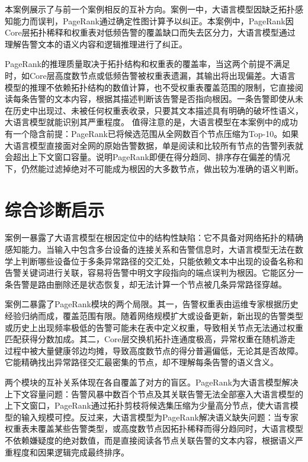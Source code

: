 本案例展示了与前一个案例相反的互补方向。案例一中，大语言模型因缺乏拓扑感知能力而误判，PageRank通过确定性图计算予以纠正。本案例中，PageRank因Core层拓扑稀释和权重表对低频告警的覆盖缺口而失去区分力，大语言模型通过理解告警文本的语义内容和逻辑推理进行了纠正。

PageRank的推理质量取决于拓扑结构和权重表的覆盖率，当这两个前提不满足时，如Core层高度数节点或低频告警被权重表遗漏，其输出将出现偏差。大语言模型的推理不依赖拓扑结构的数值计算，也不受权重表覆盖范围的限制，它直接阅读每条告警的文本内容，根据其描述判断该告警是否指向根因。一条告警即使从未在历史中出现过、未被任何权重表收录，只要其文本描述具有明确的破坏性语义，大语言模型就能识别其严重程度。
值得注意的是，大语言模型在本案例中的成功有一个隐含前提：PageRank已将候选范围从全网数百个节点压缩为Top-10。如果大语言模型直接面对全网的原始告警数据，单是阅读和比较所有节点的告警列表就会超出上下文窗口容量。说明PageRank即便在得分趋同、排序存在偏差的情况下，仍然能过滤掉绝对不可能成为根因的大多数节点，做出较为准确的语义判断。

\section{综合诊断启示}

案例一暴露了大语言模型在根因定位中的结构性缺陷：它不具备对网络拓扑的精确感知能力。当输入中包含多台设备的连接关系和告警信息时，大语言模型无法在数学上判断哪些设备位于多条异常路径的交汇处，只能依赖文本中出现的设备名称和告警关键词进行关联，容易将告警中明文字段指向的端点误判为根因。它能区分一条告警是路由删除还是状态恢复，却无法计算一个节点被几条异常路径穿越。

案例二暴露了PageRank模块的两个局限。其一，告警权重表由运维专家根据历史经验归纳而成，覆盖范围有限。随着网络规模扩大或设备更新，新出现的告警类型或历史上出现频率极低的告警可能未在表中定义权重，导致相关节点无法通过权重匹配获得分数加成。其二，Core层交换机拓扑连通度极高，异常权重在随机游走过程中被大量健康邻边均摊，导致高度数节点的得分普遍偏低，无论其是否故障。它能精确找出异常路径交汇最密集的节点，却不理解每条告警的语义含义。

两个模块的互补关系体现在各自覆盖了对方的盲区。PageRank为大语言模型解决上下文容量问题：告警风暴中数百个节点及其关联告警无法全部塞入大语言模型的上下文窗口，PageRank通过拓扑剪枝将候选集压缩为少量高分节点，使大语言模型的输入规模可控。反过来，大语言模型为PageRank解决语义缺失问题：当专家权重表未覆盖某些告警类型，或高度数节点因拓扑稀释而得分趋同时，大语言模型不依赖嫌疑度的绝对数值，而是直接阅读各节点关联告警的文本内容，根据语义严重程度和因果逻辑完成最终排序。

